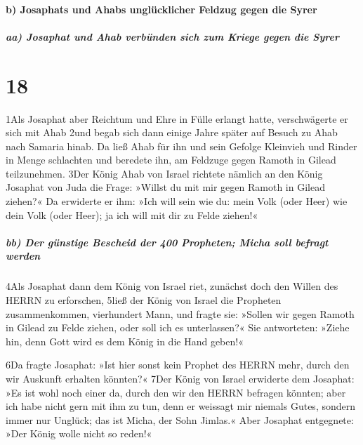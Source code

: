 \hypertarget{b-josaphats-und-ahabs-ungluxfccklicher-feldzug-gegen-die-syrer}{%
\paragraph{b) Josaphats und Ahabs unglücklicher Feldzug gegen die
Syrer}\label{b-josaphats-und-ahabs-ungluxfccklicher-feldzug-gegen-die-syrer}}

\hypertarget{aa-josaphat-und-ahab-verbuxfcnden-sich-zum-kriege-gegen-die-syrer}{%
\subparagraph{aa) Josaphat und Ahab verbünden sich zum Kriege gegen die
Syrer}\label{aa-josaphat-und-ahab-verbuxfcnden-sich-zum-kriege-gegen-die-syrer}}

\hypertarget{section-17}{%
\section{18}\label{section-17}}

1Als Josaphat aber Reichtum und Ehre in Fülle erlangt hatte,
verschwägerte er sich mit Ahab 2und begab sich dann einige Jahre später
auf Besuch zu Ahab nach Samaria hinab. Da ließ Ahab für ihn und sein
Gefolge Kleinvieh und Rinder in Menge schlachten und beredete ihn, am
Feldzuge gegen Ramoth in Gilead teilzunehmen. 3Der König Ahab von Israel
richtete nämlich an den König Josaphat von Juda die Frage: »Willst du
mit mir gegen Ramoth in Gilead ziehen?« Da erwiderte er ihm: »Ich will
sein wie du: mein Volk (oder Heer) wie dein Volk (oder Heer); ja ich
will mit dir zu Felde ziehen!«

\hypertarget{bb-der-guxfcnstige-bescheid-der-400-propheten-micha-soll-befragt-werden}{%
\subparagraph{bb) Der günstige Bescheid der 400 Propheten; Micha soll
befragt
werden}\label{bb-der-guxfcnstige-bescheid-der-400-propheten-micha-soll-befragt-werden}}

4Als Josaphat dann dem König von Israel riet, zunächst doch den Willen
des HERRN zu erforschen, 5ließ der König von Israel die Propheten
zusammenkommen, vierhundert Mann, und fragte sie: »Sollen wir gegen
Ramoth in Gilead zu Felde ziehen, oder soll ich es unterlassen?« Sie
antworteten: »Ziehe hin, denn Gott wird es dem König in die Hand geben!«

6Da fragte Josaphat: »Ist hier sonst kein Prophet des HERRN mehr, durch
den wir Auskunft erhalten könnten?« 7Der König von Israel erwiderte dem
Josaphat: »Es ist wohl noch einer da, durch den wir den HERRN befragen
könnten; aber ich habe nicht gern mit ihm zu tun, denn er weissagt mir
niemals Gutes, sondern immer nur Unglück; das ist Micha, der Sohn
Jimlas.« Aber Josaphat entgegnete: »Der König wolle nicht so reden!«

